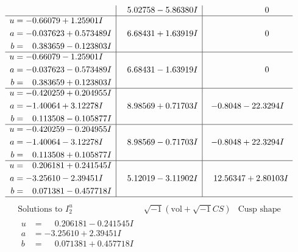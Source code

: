 \documentclass[1p]{elsarticle_modified}
\theoremstyle{definition}
\newcommand{\I}{\sqrt{-1}}
\begin{document}
$$\begin{array}{c|c|c}
 & \phantom{-}5.02758 - 5.86380 I & \phantom{-0.000000 } 0 \\ \hline\begin{aligned}
u &= -0.66079 + 1.25901 I \\
a &= -0.037623 + 0.573489 I \\
b &= \phantom{-}0.383659 - 0.123803 I\end{aligned}
 & \phantom{-}6.68431 + 1.63919 I & \phantom{-0.000000 } 0 \\ \hline\begin{aligned}
u &= -0.66079 - 1.25901 I \\
a &= -0.037623 - 0.573489 I \\
b &= \phantom{-}0.383659 + 0.123803 I\end{aligned}
 & \phantom{-}6.68431 - 1.63919 I & \phantom{-0.000000 } 0 \\ \hline\begin{aligned}
u &= -0.420259 + 0.204955 I \\
a &= -1.40064 + 3.12278 I \\
b &= \phantom{-}0.113508 - 0.105877 I\end{aligned}
 & \phantom{-}8.98569 + 0.71703 I & -0.8048 - 22.3294 I \\ \hline\begin{aligned}
u &= -0.420259 - 0.204955 I \\
a &= -1.40064 - 3.12278 I \\
b &= \phantom{-}0.113508 + 0.105877 I\end{aligned}
 & \phantom{-}8.98569 - 0.71703 I & -0.8048 + 22.3294 I \\ \hline\begin{aligned}
u &= \phantom{-}0.206181 + 0.241545 I \\
a &= -3.25610 - 2.39451 I \\
b &= \phantom{-}0.071381 - 0.457718 I\end{aligned}
 & \phantom{-}5.12019 - 3.11902 I & \phantom{-}12.56347 + 2.80103 I\\
 \hline 
 \end{array}$$\newpage$$\begin{array}{c|c|c}  
\text{Solutions to }I^u_{2}& \I (\text{vol} + \sqrt{-1}CS) & \text{Cusp shape}\\
 \hline 
\begin{aligned}
u &= \phantom{-}0.206181 - 0.241545 I \\
a &= -3.25610 + 2.39451 I \\
b &= \phantom{-}0.071381 + 0.457718 I\end{aligned}

\end{array}$$
\end{document}

